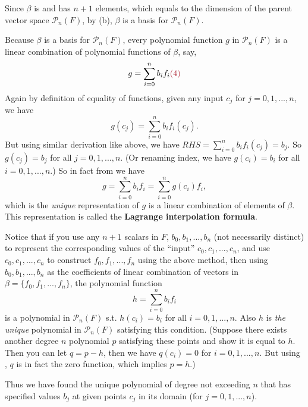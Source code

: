 Since \(\beta\) is \LID{} and has \(n + 1\) elements, which equals to the dimension of the parent vector space \(\mathcal{P}_n(F)\), by (b), \(\beta\) is a basis for \(\mathcal{P}_n(F)\).

Because \(\beta\) is a basis for \(\mathcal{P}_n(F)\), every polynomial function \(g\) in \(\mathcal{P}_n(F)\) is a linear combination of polynomial functions of \(\beta\), say,
\[
    g = \sum_{i = 0}^n b_i f_i \MAROON{(4)}
\]
Again by definition of equality of functions, given any input \(c_j\) for \(j = 0, 1, ..., n\), we have
\[
    g(c_j) = \sum_{i = 0}^n b_i f_i(c_j).
\]
But using similar derivation like above, we have \(RHS = \sum_{i = 0}^n b_i f_i(c_j) = b_j\).
So \(g(c_j) = b_j\) for all \(j = 0, 1, ..., n\).
(Or renaming index, we have \(g(c_i) = b_i\) for all \(i = 0, 1, ..., n\).)
So in fact from  we have
\[
    g = \sum_{i = 0}^n b_i f_i = \sum_{i = 0}^n g(c_i) f_i,
\]
which is the \emph{unique} representation of \(g\) is a linear combination of elements of \(\beta\).
This representation is called the \textbf{Lagrange interpolation formula}.

Notice that if you use any \(n + 1\) scalars in \(F\), \(b_0, b_1, ..., b_n\) (not necessarily distinct) to represent the corresponding values of the ``input'' \(c_0, c_1, ..., c_n\),
and use \(c_0, c_1, ..., c_n\) to construct \(f_0, f_1, ..., f_n\) using the above method,
then using \(b_0, b_1, ..., b_n\) as the coefficients of linear combination of vectors in \(\beta = \{ f_0, f_1, ..., f_n \}\), the polynomial function
\[
    h = \sum_{i = 0}^n b_i f_i
\]
is a polynomial in \(\mathcal{P}_n(F)\) s.t. \(h(c_i) = b_i\) for all \(i = 0, 1, ..., n\).
Also \(h\) is \emph{the unique} polynomial in \(\mathcal{P}_n(F)\) satisfying this condition.
(Suppose there exists another degree \(n\) polynomial \(p\) satisfying these points and show it is equal to \(h\).
Then you can let \(q = p - h\), then we have \(q(c_i) = 0\) for \(i = 0, 1, ..., n\).
But using  , \(q\) is in fact the zero function, which implies \(p = h\).)

Thus we have found the unique polynomial of degree not exceeding \(n\) that has specified values \(b_j\) at given points \(c_j\) in its domain (for \(j = 0, 1, ..., n\)).

